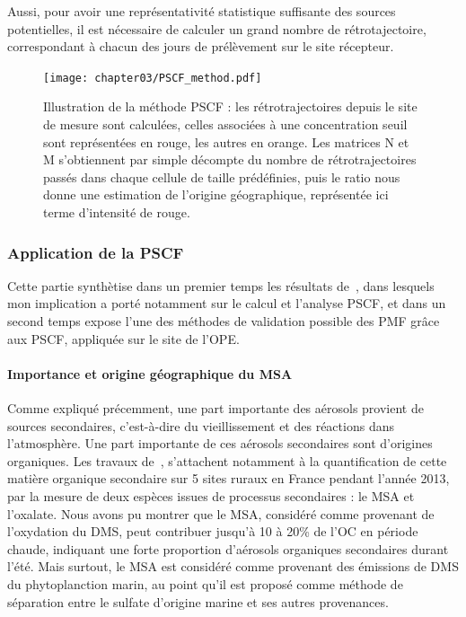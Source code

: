 Aussi, pour avoir une représentativité statistique suffisante des sources potentielles, il
est nécessaire de calculer un grand nombre de rétrotajectoire, correspondant à chacun des
jours de prélèvement sur le site récepteur.

\begin{figure}[ht]
    \centering
    \texttt{[image: chapter03/PSCF\_method.pdf]}
    \caption{Illustration de la méthode PSCF : les rétrotrajectoires depuis le site de
        mesure sont calculées, celles associées à une concentration seuil sont
        représentées en rouge, les autres en orange. Les matrices N et M s'obtiennent par
        simple décompte du nombre de rétrotrajectoires passés dans chaque cellule de
        taille prédéfinies, puis le ratio nous donne une estimation de l'origine
    géographique, représentée ici terme d'intensité de rouge.}%
    \label{fig:chapter02/PSCF_method}
\end{figure}

\subsubsection{Application de la PSCF}%
\label{ssub:application_de_la_pscf}

\begin{tcolorbox}[colback=red!5!white,colframe=Melon,title=Note]
Cette partie synthètise dans un premier temps les résultats de~\cite{gollyOrganic2019},
dans lesquels mon implication a porté notamment sur le calcul et l'analyse PSCF, et dans
un second temps expose l'une des méthodes de validation possible des PMF grâce aux PSCF,
appliquée sur le site de l'OPE.
\end{tcolorbox}

\paragraph{Importance et origine géographique du MSA}%
\label{par:origine_terrestre_ou_marine_du_msa_}

Comme expliqué précemment, une part importante des aérosols provient de sources
secondaires, c'est-à-dire du vieillissement et des réactions dans l'atmosphère. Une part
importante de ces aérosols secondaires sont d'origines organiques. Les travaux
de~\textcite{gollyOrganic2019}, s'attachent notamment à la quantification de cette matière
organique secondaire sur 5 sites ruraux en France pendant l'année 2013, par la mesure de
deux espèces issues de processus secondaires : le MSA et l'oxalate.  Nous avons pu montrer
que le MSA, considéré comme provenant de l'oxydation du DMS, peut contribuer jusqu'à 10 à
20\% de l'OC en période chaude, indiquant une forte proportion d'aérosols organiques
secondaires durant l'été. Mais surtout, le MSA est considéré comme provenant des émissions
de DMS du phytoplanction marin, au point qu'il est proposé comme méthode de séparation
entre le sulfate d'origine marine et ses autres provenances.

